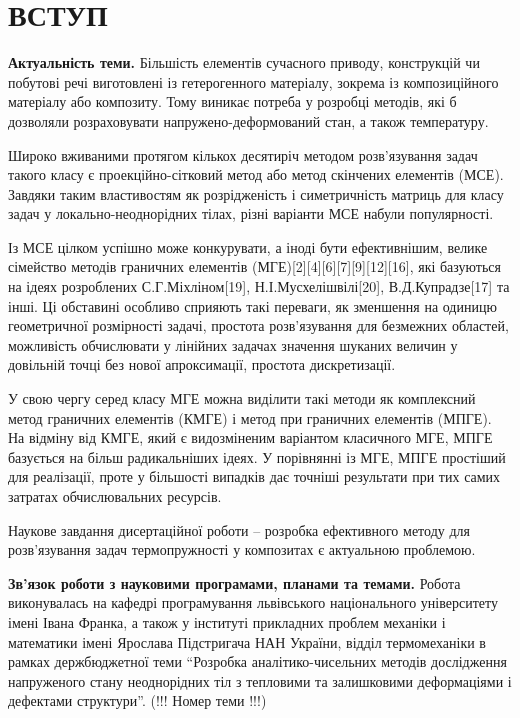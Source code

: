 \chapter{ВСТУП}

\textbf{Актуальність теми.} 
Більшість елементів сучасного приводу, конструкцій чи побутові речі виготовлені із гетерогенного матеріалу, зокрема із композиційного матеріалу або композиту. Тому виникає потреба у розробці методів, які б дозволяли розраховувати напружено-деформований стан, а також температуру.

Широко вживаними протягом кількох десятиріч методом розв'язування задач такого класу є проекційно-сітковий метод або метод скінчених елементів (МСЕ). Завдяки таким властивостям як розрідженість і симетричність матриць для класу задач у локально-неоднорідних тілах, різні варіанти МСЕ набули популярності.

Із МСЕ цілком успішно може конкурувати, а іноді бути ефективнішим,
велике сімейство методів граничних елементів
(МГЕ){[}2{]}{[}4{]}{[}6{]}{[}7{]}{[}9{]}{[}12{]}{[}16{]}, які базуються
на ідеях розроблених С.Г.Міхліном{[}19{]}, Н.І.Мусхелішвілі{[}20{]},
В.Д.Купрадзе{[}17{]} та інші. Ці обставині особливо сприяють такі
переваги, як зменшення на одиницю геометричної розмірності задачі,
простота розв'язування для безмежних областей, можливість обчислювати у
лінійних задачах значення шуканих величин у довільній точці без нової
апроксимації, простота дискретизації.

У свою чергу серед класу МГЕ можна виділити такі методи як комплексний
метод граничних елементів (КМГЕ) і метод при граничних елементів (МПГЕ).
На відміну від КМГЕ, який є видозміненим варіантом класичного МГЕ, МПГЕ
базується на більш радикальніших ідеях. У порівнянні із МГЕ, МПГЕ
простіший для реалізації, проте у більшості випадків дає точніші
результати при тих самих затратах обчислювальних ресурсів.

Наукове завдання дисертаційної роботи -- розробка ефективного методу для
розв'язування задач термопружності у композитах є актуальною проблемою.

\textbf{Зв'язок роботи з науковими програмами, планами та
темами.} Робота виконувалась на кафедрі програмування львівського
національного університету імені Івана Франка, а також у інституті
прикладних проблем механіки і математики імені Ярослава Підстригача НАН
України, відділ термомеханіки в рамках держбюджетної теми ``Розробка
аналітико-чисельних методів дослідження напруженого стану неоднорідних
тіл з тепловими та залишковими деформаціями і дефектами структури''.
(!!! Номер теми !!!)

